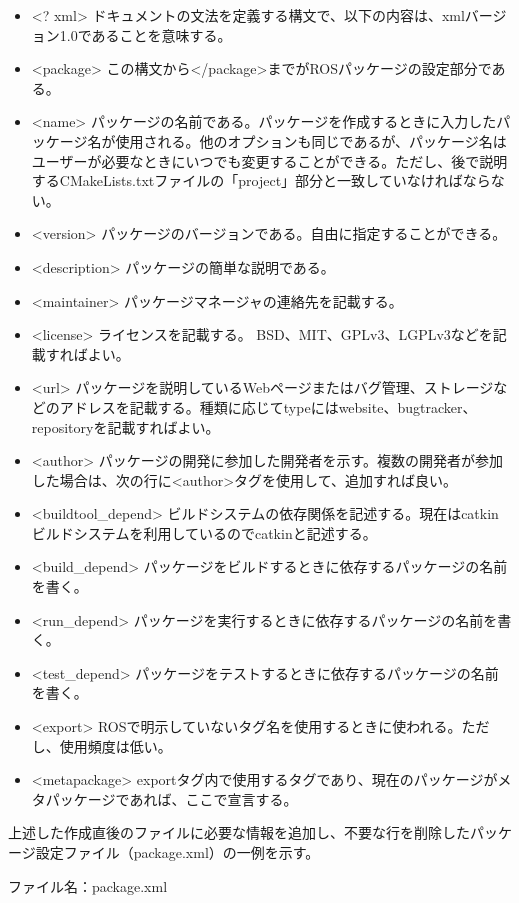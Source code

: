 \begin{itemize}
\item <? xml> ドキュメントの文法を定義する構文で、以下の内容は、xmlバージョン1.0であることを意味する。
\item <package> この構文から</package>までがROSパッケージの設定部分である。
\item <name> パッケージの名前である。パッケージを作成するときに入力したパッケージ名が使用される。他のオプションも同じであるが、パッケージ名はユーザーが必要なときにいつでも変更することができる。ただし、後で説明するCMakeLists.txtファイルの「project」部分と一致していなければならない。
\item <version> パッケージのバージョンである。自由に指定することができる。
\item <description> パッケージの簡単な説明である。
\item <maintainer> パッケージマネージャの連絡先を記載する。
\item <license> ライセンスを記載する。 BSD、MIT、GPLv3、LGPLv3などを記載すればよい。
\item <url> パッケージを説明しているWebページまたはバグ管理、ストレージなどのアドレスを記載する。種類に応じてtypeにはwebsite、bugtracker、repositoryを記載すればよい。
\item <author> パッケージの開発に参加した開発者を示す。複数の開発者が参加した場合は、次の行に<author>タグを使用して、追加すれば良い。
\item <buildtool\_depend> ビルドシステムの依存関係を記述する。現在はcatkinビルドシステムを利用しているのでcatkinと記述する。
\item <build\_depend> パッケージをビルドするときに依存するパッケージの名前を書く。
\item <run\_depend> パッケージを実行するときに依存するパッケージの名前を書く。
\item <test\_depend> パッケージをテストするときに依存するパッケージの名前を書く。
\item <export> ROSで明示していないタグ名を使用するときに使われる。ただし、使用頻度は低い。
\item <metapackage> exportタグ内で使用するタグであり、現在のパッケージがメタパッケージであれば、ここで宣言する。
\end{itemize}

上述した作成直後のファイルに必要な情報を追加し、不要な行を削除したパッケージ設定ファイル（package.xml）の一例を示す。

ファイル名：package.xml

